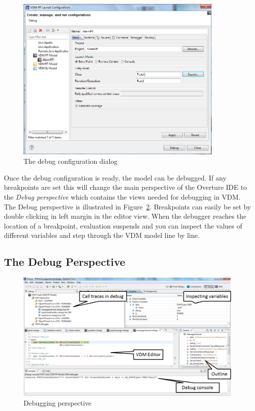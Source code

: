 \begin{figure}[htp]
\begin{center}
  \includegraphics[width=4in]{figures/DebugConfiguration}
  \caption{The debug configuration dialog}
  \label{fig:debugConfiguration}
\end{center}
\end{figure}

Once the debug configuration is ready, the model can be debugged. If
any breakpoints are set this
will change the main perspective of the Overture IDE to the
\emph{Debug perspective} which contains the views needed for debugging
in VDM. The Debug perspective is illustrated in Figure~\ref{fig:DebuggingVDM}.
Breakpoints can easily be set by double clicking in left
margin in the editor view. When the debugger reaches the location of a
breakpoint, evaluation suspends and you can inspect the values of
different variables and step through the VDM model line by line.

\subsection{The Debug Perspective}


\begin{figure}[htp]
\begin{center}
  \includegraphics[width=5in]{figures/DebuggingVDM}
  \caption[Debugging perspective]{Debugging perspective}
  \label{fig:DebuggingVDM}
\end{center}
\end{figure}

